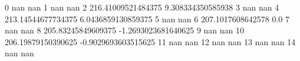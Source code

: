 0 nan nan
1 nan nan
2 216.41009521484375 9.308334350585938
3 nan nan
4 213.14544677734375 6.0436859130859375
5 nan nan
6 207.1017608642578 0.0
7 nan nan
8 205.83245849609375 -1.2693023681640625
9 nan nan
10 206.19879150390625 -0.9029693603515625
11 nan nan
12 nan nan
13 nan nan
14 nan nan
